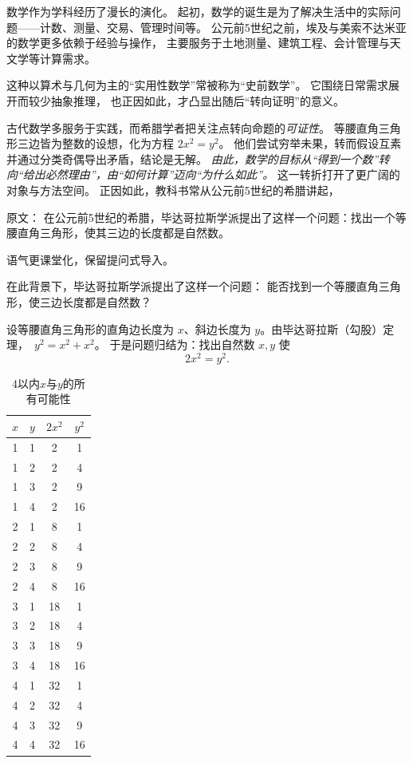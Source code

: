 数学作为学科经历了漫长的演化。  
起初，数学的诞生是为了解决生活中的实际问题——计数、测量、交易、管理时间等。  
公元前5世纪之前，埃及与美索不达米亚的数学更多依赖于经验与操作，  
主要服务于土地测量、建筑工程、会计管理与天文学等计算需求。


这种以算术与几何为主的“实用性数学”常被称为“史前数学”。  
它围绕日常需求展开而较少抽象推理，  
也正因如此，才凸显出随后“转向证明”的意义。


古代数学多服务于实践，而希腊学者把关注点转向命题的\emph{可证性}。  
等腰直角三角形三边皆为整数的设想，化为方程 $2x^2=y^2$。  
他们尝试穷举未果，转而假设互素并通过分类奇偶导出矛盾，结论是无解。  
\emph{由此，数学的目标从“得到一个数”转向“给出必然理由”，由“如何计算”迈向“为什么如此”。}  
这一转折打开了更广阔的对象与方法空间。
正因如此，教科书常从公元前5世纪的希腊讲起，  

原文：
在公元前5世纪的希腊，毕达哥拉斯学派提出了这样一个问题：找出一个等腰直角三角形，使其三边的长度都是自然数。


语气更课堂化，保留提问式导入。


在此背景下，毕达哥拉斯学派提出了这样一个问题：  
能否找到一个等腰直角三角形，使三边长度都是自然数？





设等腰直角三角形的直角边长度为 $x$、斜边长度为 $y$。由毕达哥拉斯（勾股）定理，~$y^2=x^2+x^2$。  
于是问题归结为：找出自然数 $x,y$ 使
\begin{equation}\label{eqn}
2x^2=y^2.
\end{equation}


\begin{table}[htbp]
\centering
\caption{4以内$x$与$y$的所有可能性}
\begin{tabular}{|c|c|c|c|}
\hline
$x$ & $y$ & $2x^2$ & $y^2$ \\
\hline
1 & 1 & 2 & 1 \\
\hline
1 & 2 & 2 & 4 \\
\hline
1 & 3 & 2 & 9 \\
\hline
1 & 4 & 2 & 16 \\
\hline
2 & 1 & 8 & 1 \\
\hline
2 & 2 & 8 & 4 \\
\hline
2 & 3 & 8 & 9 \\
\hline
2 & 4 & 8 & 16 \\
\hline
3 & 1 & 18 & 1 \\
\hline
3 & 2 & 18 & 4 \\
\hline
3 & 3 & 18 & 9 \\
\hline
3 & 4 & 18 & 16 \\
\hline
4 & 1 & 32 & 1 \\
\hline
4 & 2 & 32 & 4 \\
\hline
4 & 3 & 32 & 9 \\
\hline
4 & 4 & 32 & 16 \\
\hline
\end{tabular}
\label{tab:example}
\end{table}


